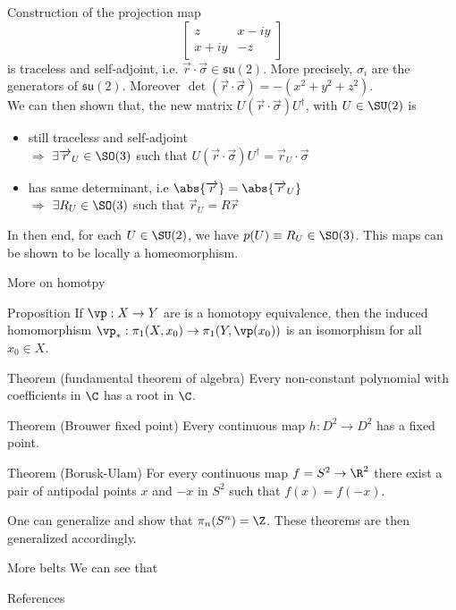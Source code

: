 \documentclass[9pt]{beamer}
\renewcommand{\emph}{\alert}
\begin{document}
\begin{frame}{Construction of the projection map}
\begin{equation*}
\begin{bmatrix}
            z & x-iy\\
            x+iy & -z
        \end{bmatrix}
    \end{equation*}
    is \emph{traceless} and \emph{self-adjoint}, i.e. $\overrightarrow{r}\cdot \overrightarrow{\sigma}\in\mathfrak{su}(2)$. More precisely, $\sigma_i$ are the generators of $\mathfrak{su}(2)$. Moreover $\det(\overrightarrow{r}\cdot \overrightarrow{\sigma})=-(x^2+y^2+z^2)$.\\[0.2cm]
    We can then shown that, the new matrix $U(\overrightarrow{r}\cdot \overrightarrow{\sigma})U^\dagger$, with $U\in\SU(2)$ is 
    \begin{itemize}
        \item still traceless and self-adjoint \\
            $\Rightarrow$ $\exists \overrightarrow{r}_U\in\SO(3)$ such that $U(\overrightarrow{r}\cdot \overrightarrow{\sigma})U^\dagger=\overrightarrow{r}_U\cdot \overrightarrow{\sigma}$
        \item has same determinant, i.e $\abs{\overrightarrow{r}}=\abs{\overrightarrow{r}_U}$\\
            $\Rightarrow$ $\exists R_U\in\SO(3)$ such that $\overrightarrow{r}_U=R\overrightarrow{r}$
    \end{itemize}
    In then end, for each $U\in\SU(2)$, we have $p(U)\equiv R_U\in\SO(3)$. This maps can be shown to be locally a \emph{homeomorphism}.
\end{frame}

\begin{frame}{More on homotpy}

    \begin{block}{Proposition}
        If $\vp:X\to Y$ are is a homotopy equivalence, then the induced homomorphism $\vp_*:\pi_1(X,x_0)\to\pi_1(Y,\vp(x_0))$ is an isomorphism for all $x_0\in X$.
    \end{block}
    \begin{block}{Theorem (fundamental theorem of algebra)}
        Every non-constant polynomial with coefficients in $\C$ has a root in $\C$.
    \end{block}
    \begin{block}{Theorem (Brouwer fixed point)}
        Every continuous map $h:D^2\to D^2$ has a fixed point.
    \end{block}
    \begin{block}{Theorem (Borusk-Ulam)}
        For every continuous map $f=S^2\to \R^2$ there exist a pair of antipodal points $x$ and $-x$ in $S^2$ such that $f(x)=f(-x)$.
    \end{block}

    One can generalize and show that $\pi_n(S^n)=\Z$. These theorems are then generalized accordingly.
    
\end{frame}

\begin{frame}{More belts}
    We can see that
\end{frame}

\begin{frame}{References}

    
    

\end{frame}
\end{document}
